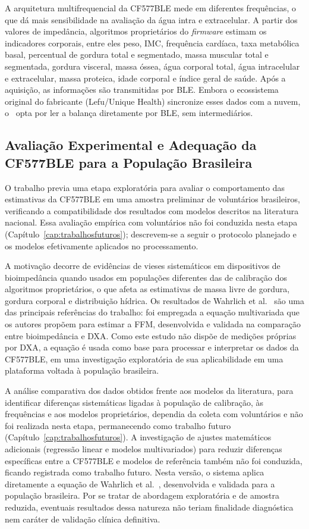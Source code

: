 A arquitetura multifrequencial da CF577BLE mede em diferentes frequências, o que dá mais
sensibilidade na avaliação da água intra e extracelular. A partir dos valores de
impedância, algoritmos proprietários do \emph{firmware} estimam os indicadores corporais,
entre eles peso, IMC, frequência cardíaca, taxa metabólica basal, percentual de gordura
total e segmentado, massa muscular total e segmentada, gordura visceral, massa óssea, água
corporal total, água intracelular e extracelular, massa proteica, idade corporal e índice
geral de saúde. Após a aquisição, as informações são transmitidas por BLE. Embora o
ecossistema original do fabricante (Lefu/Unique Health) sincronize esses dados com a nuvem,
o \sintonia\ opta por ler a balança diretamente por BLE, sem intermediários.

\subsection{Avaliação Experimental e Adequação da CF577BLE para a População Brasileira}

O trabalho previa uma etapa exploratória para avaliar o comportamento das estimativas da
CF577BLE em uma amostra preliminar de voluntários brasileiros, verificando a
compatibilidade dos resultados com modelos descritos na literatura nacional. Essa
avaliação empírica com voluntários não foi conduzida nesta etapa
(Capítulo~\ref{cap:trabalhosfuturos}); descrevem-se a seguir o protocolo planejado e os
modelos efetivamente aplicados no processamento.

A motivação decorre de evidências de vieses sistemáticos em dispositivos de bioimpedância
quando usados em populações diferentes das de calibração dos algoritmos proprietários,
o que afeta as estimativas de massa livre de gordura, gordura corporal e distribuição
hídrica. Os resultados de Wahrlich et al.~\cite{wahrlich2026} são uma das principais
referências do trabalho: foi empregada a equação multivariada que os autores propõem para
estimar a FFM, desenvolvida e validada na comparação entre bioimpedância e DXA. Como este
estudo não dispõe de medições próprias por DXA, a equação é usada como base para processar
e interpretar os dados da CF577BLE, em uma investigação exploratória de sua aplicabilidade
em uma plataforma voltada à população brasileira.

A análise comparativa dos dados obtidos frente aos modelos da literatura, para identificar
diferenças sistemáticas ligadas à população de calibração, às frequências e aos modelos
proprietários, dependia da coleta com voluntários e não foi realizada nesta etapa,
permanecendo como trabalho futuro (Capítulo~\ref{cap:trabalhosfuturos}). A investigação de
ajustes matemáticos adicionais (regressão linear e modelos multivariados) para reduzir
diferenças específicas entre a CF577BLE e modelos de referência também não foi conduzida,
ficando registrada como trabalho futuro. Nesta versão, o sistema aplica diretamente a
equação de Wahrlich et al.~\cite{wahrlich2026}, desenvolvida e validada para a população
brasileira. Por se tratar de abordagem exploratória e de amostra reduzida, eventuais
resultados dessa natureza não teriam finalidade diagnóstica nem caráter de validação
clínica definitiva.

